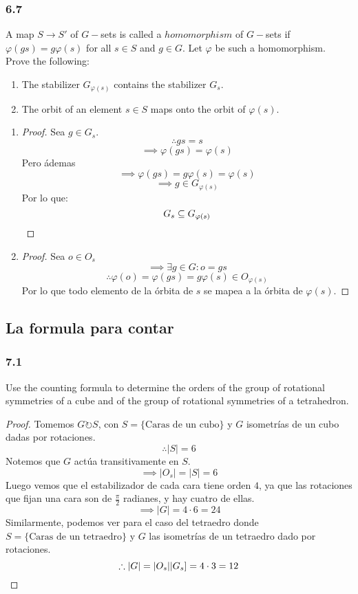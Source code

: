 \documentclass[11pt]{article}
\theoremstyle{definition}
\begin{document}
\subsubsection{6.7}
A map $S\rightarrow S'$ of $G-$sets is called a $homomorphism$ of $G-$sets if $\varphi(gs)=g\varphi(s)$ for all $s\in S$ and $g\in G$. Let $\varphi$ be such a homomorphism. Prove the following:
\begin{enumerate}[label=(\alph*)]
    \item The stabilizer $G_{\varphi(s)}$ contains the stabilizer $G_s$.

    \item The orbit of an element $s\in S$ maps onto the orbit of $\varphi(s)$.
\end{enumerate}
\begin{enumerate}[label=(\alph*)]
    \item \begin{proof}
        Sea $g\in G_s$.
        \[\therefore gs=s\]
        \[\implies\varphi(gs)=\varphi(s)\]
        Pero ádemas
        \[\implies \varphi(gs)=g\varphi(s)=\varphi(s)\]
        \[\implies g\in G_{\varphi(s)}\]
        Por lo que:
        \[G_s\subseteq G_{\varphi(s)}\qedhere\]
    \end{proof}

    \item \begin{proof}
        Sea $o\in O_s$
        \[\implies \exists g\in G: o=gs\]
        \[\therefore \varphi(o)=\varphi(gs)=g\varphi(s)\in O_{\varphi(s)}\]
        Por lo que todo elemento de la órbita de $s$ se mapea a la órbita de $\varphi(s)$.
    \end{proof}
\end{enumerate}
\subsection{La formula para contar}
\subsubsection{7.1}
Use the counting formula to determine the orders of the group of rotational symmetries of a cube and of the group of rotational symmetries of a tetrahedron.
\begin{proof}
    Tomemos $G\circlearrowright S$, con $S=\{\textrm{Caras de un cubo}\}$ y $G$ isometrías de un cubo dadas por rotaciones.
    \[\therefore|S|=6\]
    Notemos que $G$ actúa transitivamente en $S$.
    \[\implies |O_s|=|S|=6\]
    Luego vemos que el estabilizador de cada cara tiene orden $4$, ya que las rotaciones que fijan una cara son de $\frac{\pi}{2}$ radianes, y hay cuatro de ellas.
    \[\implies |G|=4\cdot 6=24\]
    Similarmente, podemos ver para el caso del tetraedro donde $S=\{\textrm{Caras de un tetraedro}\}$ y $G$ las isometrías de un tetraedro dado por rotaciones.
    \[\therefore |G|=|O_s||G_s]=4\cdot 3=12\qedhere\]
\end{proof}
\end{document}

